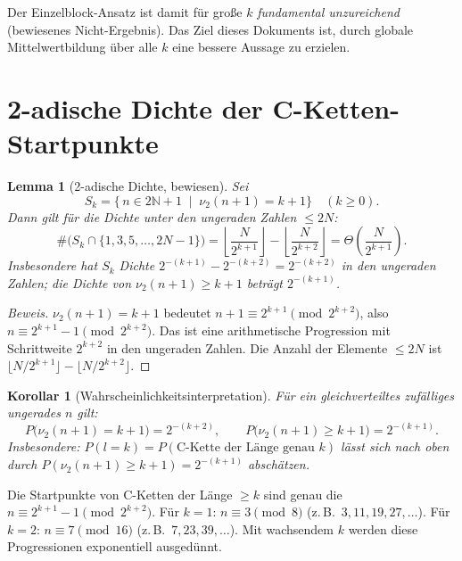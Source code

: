 \documentclass[12pt,a4paper]{article}
\newtheorem{lemma}[definition]{Lemma}
\newtheorem{korollar}[definition]{Korollar}
\newenvironment{beweis}{\begin{proof}[Beweis]}{\end{proof}}
\newcommand{\vii}{\nu_2}
\newcommand{\N}{\mathbb{N}}
\begin{document}
Der Einzelblock-Ansatz ist damit für große $k$ \emph{fundamental
unzureichend} (bewiesenes Nicht-Ergebnis). Das Ziel dieses Dokuments
ist, durch globale Mittelwertbildung über alle $k$ eine bessere
Aussage zu erzielen.

\section{2-adische Dichte der C-Ketten-Startpunkte}
\label{sec:dichte}

\begin{lemma}[2-adische Dichte, bewiesen]
\label{lem:dichte}
Sei
\[
  S_k = \bigl\{\, n \in 2\N+1 \;\mid\; \vii(n+1) = k+1 \bigr\}
  \quad (k \geq 0).
\]
Dann gilt für die Dichte unter den ungeraden Zahlen $\leq 2N$:
\[
  \#\bigl(S_k \cap \{1,3,5,\ldots,2N-1\}\bigr)
  = \left\lfloor \frac{N}{2^{k+1}} \right\rfloor
  - \left\lfloor \frac{N}{2^{k+2}} \right\rfloor
  = \Theta\!\left(\frac{N}{2^{k+1}}\right).
\]
Insbesondere hat $S_k$ Dichte $2^{-(k+1)} - 2^{-(k+2)} = 2^{-(k+2)}$
in den ungeraden Zahlen; die Dichte von $\vii(n+1) \geq k+1$ beträgt
$2^{-(k+1)}$.
\end{lemma}

\begin{beweis}
$\vii(n+1) = k+1$ bedeutet $n+1 \equiv 2^{k+1} \pmod{2^{k+2}}$, also
$n \equiv 2^{k+1}-1 \pmod{2^{k+2}}$. Das ist eine arithmetische
Progression mit Schrittweite $2^{k+2}$ in den ungeraden Zahlen. Die
Anzahl der Elemente $\leq 2N$ ist $\lfloor N/2^{k+1}\rfloor -
\lfloor N/2^{k+2}\rfloor$.
\end{beweis}

\begin{korollar}[Wahrscheinlichkeitsinterpretation]
Für ein gleichverteiltes zufälliges ungerades $n$ gilt:
\[
  P\!\bigl(\vii(n+1) = k+1\bigr) = 2^{-(k+2)},
  \qquad
  P\!\bigl(\vii(n+1) \geq k+1\bigr) = 2^{-(k+1)}.
\]
Insbesondere: $P(l=k) = P(\text{C-Kette der Länge genau } k)$
lässt sich nach oben durch $P(\vii(n+1) \geq k+1) = 2^{-(k+1)}$
abschätzen.
\end{korollar}

\begin{tcolorbox}[adisch, title={Arithmetische Progression}]
Die Startpunkte von C-Ketten der Länge $\geq k$ sind genau die
$n \equiv 2^{k+1}-1 \pmod{2^{k+2}}$. Für $k=1$: $n \equiv 3 \pmod 8$
(z.\,B.\ $3, 11, 19, 27, \ldots$). Für $k=2$: $n \equiv 7 \pmod{16}$
(z.\,B.\ $7, 23, 39, \ldots$). Mit wachsendem $k$ werden diese
Progressionen exponentiell ausgedünnt.
\end{tcolorbox}
\end{document}

